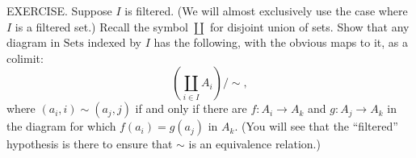 EXERCISE. Suppose $I$ is filtered. (We will almost exclusively use the case where $I$ is a filtered set.) Recall the symbol $\coprod$ for disjoint union of sets. Show that any diagram in $\mathrm{Sets}$ indexed by $I$ has the following, with the obvious maps to it, as a colimit:
$$\left(\coprod_{i\in I}A_i\right)/{\sim},$$
where $(a_i,i)\sim(a_j,j)$ if and only if there are $f:A_i\to A_k$ and $g:A_j\to A_k$ in the diagram for which $f(a_i)=g(a_j)$ in $A_k$. (You will see that the “filtered” hypothesis is there to ensure that $\sim$ is an equivalence relation.)
